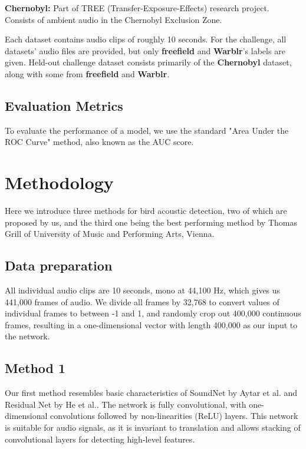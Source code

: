 \documentclass[10pt,twocolumn,letterpaper]{article}
\begin{document}
\textbf{Chernobyl:} Part of TREE (Transfer-Exposure-Effects) research
project. Consists of ambient audio in the Chernobyl Exclusion Zone. 

Each dataset contains audio clips of roughly 10 seconds. For the challenge,
all datasets' audio files are provided, but only \textbf{freefield} and
\textbf{Warblr}'s labels are given. Held-out challenge dataset consists
primarily of the \textbf{Chernobyl} dataset, along with some from
\textbf{freefield} and \textbf{Warblr}.

\subsection{Evaluation Metrics}

To evaluate the performance of a model, we use the standard "Area Under the
ROC Curve" method, also known as the AUC score.

\section{Methodology}

Here we introduce three methods for bird acoustic detection, two of which
are proposed by us, and the third one being the best performing method by
Thomas Grill of University of Music and Performing Arts, Vienna. 

\subsection{Data preparation}

All individual audio clips are 10 seconds, mono at 44,100 Hz, which gives us
441,000 frames of audio. We divide all frames by 32,768 to convert values of
individual frames to between -1 and 1, and randomly crop out 400,000
continuous frames, resulting in a one-dimensional vector with length 400,000
as our input to the network.

\subsection{Method 1}

Our first method resembles basic characteristics of SoundNet by Aytar et
al.\cite{soundnet} and Residual Net by He et al.\cite{residual_net}. The
network is fully convolutional, with one-dimensional convolutions followed
by non-linearities (ReLU) layers.  This network is suitable for audio
signals, as it is invariant to translation and allows stacking of
convolutional layers for detecting high-level features.
\end{document}
